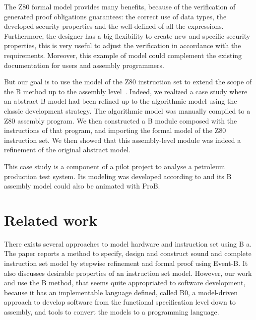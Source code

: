 \documentclass[a4paper]{llncs}
\begin{document}
The Z80 formal model provides many benefits, because of the
verification of generated proof obligations guarantees: the correct
use of data types, the developed security properties and the
well-defined of all the expressions.  Furthermore, the designer has a
big flexibility to create new and specific security properties, this
is very
useful %
to adjust the verification in accordance with the
requirements. Moreover, this example of model could complement the
existing documentation for users and assembly programmers. 

But our goal is to use the model of the Z80 instruction set to extend
the scope of the B method up to the assembly
level~\cite{Dantas_SBMF08}. Indeed, we realized a case study where an
abstract B model had been refined up to the algorithmic model using
the classic development strategy. The algorithmic model was manually
compiled to a Z80 assembly program. We then constructed a B module
composed with the instructions of that program, and importing the
formal model of the Z80 instruction set. We then showed that this
assembly-level module was indeed a refinement of the original abstract
model.

This case study is a component of a pilot project to analyse a
petroleum production test system. Its modeling was developed according
to \cite{LAUT_SERGIO} and its B assembly model could also be animated
with ProB.

\section{Related work}
\label{sec:relatedworks}

There exists several approaches to model hardware and instruction set
using B a.  The paper \cite{springerlink:Yuan2011} reports a method to
specify, design and construct sound and complete instruction set model
by stepwise refinement and formal proof using Event-B. It also
discusses desirable properties of an instruction set model. However,
our work \cite{Valerio_SBMF09} and \cite{Subotic2010} use the B
method, that seems quite appropriated to software development, because
it has an implementable language defined, called B0, a model-driven
approach \cite{Dantas_SBMF08} to develop software from the functional
specification level down to assembly, and tools to convert the models
to a programming language.
\end{document}
